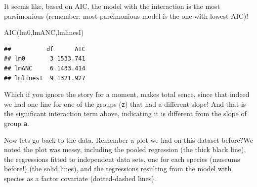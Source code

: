 \documentclass[
]{book}
\newenvironment{Shaded}{\begin{snugshade}}{\end{snugshade}}
\newcommand{\FunctionTok}[1]{\textcolor[rgb]{0.00,0.00,0.00}{#1}}
\newcommand{\NormalTok}[1]{#1}
\begin{document}
It seems like, based on AIC, the model with the interaction is the most parsimonious (remember: most parcimonious model is the one with lowest AIC)!

\begin{Shaded}
\begin{Highlighting}[]
\FunctionTok{AIC}\NormalTok{(lm0,lmANC,lmlinesI)}
\end{Highlighting}
\end{Shaded}

\begin{verbatim}
##          df      AIC
## lm0       3 1533.741
## lmANC     6 1433.414
## lmlinesI  9 1321.927
\end{verbatim}

Which if you ignore the story for a moment, makes total sence, since that indeed we had one line for one of the groups (\texttt{z}) that had a different slope! And that is the significant interaction term above, indicating it is different from the slope of group \texttt{a}.

Now lets go back to the data. Remember a plot we had on this dataset before?We noted the plot was messy, including the pooled regression (the thick black line), the regressions fitted to independent data sets, one for each species (museums before!) (the solid lines), and the regressions resulting from the model with species as a factor covariate (dotted-dashed lines).
\end{document}
